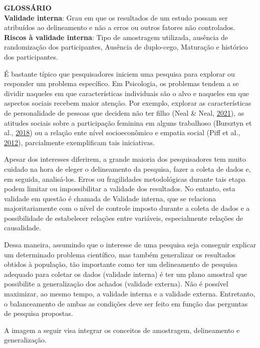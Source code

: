 \documentclass[
]{book}
\begin{document}
\begin{glossario}
\textbf{GLOSSÁRIO}\\
\textbf{Validade interna}: Grau em que os resultados de um estudo possam
ser atribuídos ao delineamento e não a erros ou outros fatores não
controlados.\\
\textbf{Riscos à validade interna}: Tipo de amostragem utilizada,
ausência de randomização dos participantes, Ausência de duplo-cego,
Maturação e histórico dos participantes.
\end{glossario}

É bastante típico que pesquisadores iniciem uma pesquisa para explorar
ou responder um problema específico. Em Psicologia, os problemas tendem
a se dividir naqueles em que características individuais são o alvo e
naqueles em que aspectos sociais recebem maior atenção. Por exemplo,
explorar as características de personalidade de pessoas que decidem não
ter filho (Neal \& Neal, \protect\hyperlink{ref-Neal2021}{2021}), as
atitudes sociais sobre a participação feminina em alguns trabalhoso
(Bursztyn et al., \protect\hyperlink{ref-Bursztyn2018}{2018}) ou a
relação ente nível socioeconômico e empatia social (Piff et al.,
\protect\hyperlink{ref-Piff2012}{2012}), parcialmente exemplificam tais
iniciativas.

Apesar dos interesses diferirem, a grande maioria dos pesquisadores tem
muito cuidado na hora de eleger o delineamento da pesquisa, fazer a
coleta de dados e, em seguida, analisá-los. Erros ou fragilidades
metodológicas durante tais etapa podem limitar ou impossibilitar a
validade dos resultados. No entanto, esta validade em questão é chamada
de Validade interna, que se relaciona majoritariamente com o nível de
controle imposto durante a coleta de dados e a possibilidade de
estabelecer relações entre variáveis, especialmente relações de
causalidade.

Dessa maneira, assumindo que o interesse de uma pesquisa seja conseguir
explicar um determinado problema científico, mas também generalizar os
resultados obtidos à população, tão importante como ter um delineamento
de pesquisa adequado para coletar os dados (validade interna) é ter um
plano amostral que possibilite a generalização dos achados (validade
externa). Não é possível maximizar, ao mesmo tempo, a validade interna e
a validade externa. Entretanto, o balanceamento de ambas as condições
deve ser feito em função das perguntas de pesquisa propostas.

A imagem a seguir visa integrar os conceitos de amostragem, delineamento
e generalização.
\end{document}
